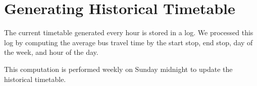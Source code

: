 \section{Generating Historical Timetable}
\label{sec:historical_timetable}
\par The current timetable generated every hour is stored in a log. We processed this log by computing the average bus travel time by the start stop, end stop, day of the week, and hour of the day.

\par This computation is performed weekly on Sunday midnight to update the historical timetable.
